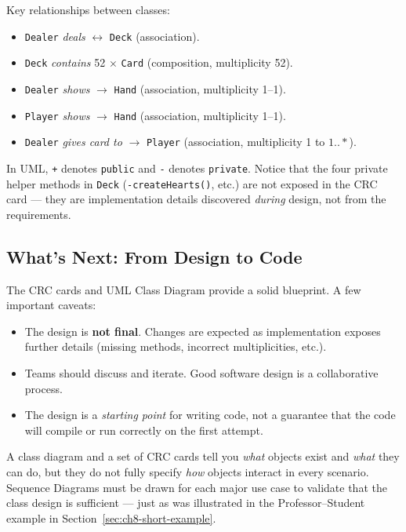 \documentclass[11pt, a4paper, notitlepage]{report}
\theoremstyle{definition}
\theoremstyle{remark}
\theoremstyle{definition}
\begin{document}
\noindent Key relationships between classes:
\begin{itemize}
  \item \texttt{Dealer} \emph{deals} $\longleftrightarrow$ \texttt{Deck} (association).
  \item \texttt{Deck} \emph{contains} 52 $\times$ \texttt{Card} (composition, multiplicity 52).
  \item \texttt{Dealer} \emph{shows} $\longrightarrow$ \texttt{Hand}
        (association, multiplicity 1--1).
  \item \texttt{Player} \emph{shows} $\longrightarrow$ \texttt{Hand}
        (association, multiplicity 1--1).
  \item \texttt{Dealer} \emph{gives card to} $\longrightarrow$ \texttt{Player}
        (association, multiplicity 1 to $1..*$).
\end{itemize}

\begin{examtip}[title={Exam Tip: Visibility and Naming}]
In UML, \texttt{+} denotes \texttt{public} and \texttt{-} denotes \texttt{private}.
Notice that the four private helper methods in \texttt{Deck}
(\texttt{-createHearts()}, etc.) are not exposed in the CRC card --- they are
implementation details discovered \emph{during} design, not from the requirements.
\end{examtip}

\subsection{What's Next: From Design to Code}
\label{subsec:ch8-next}

The CRC cards and UML Class Diagram provide a solid blueprint. A few important caveats:

\begin{itemize}
  \item The design is \textbf{not final}. Changes are expected as implementation exposes
        further details (missing methods, incorrect multiplicities, etc.).
  \item Teams should discuss and iterate. Good software design is a collaborative process.
  \item The design is a \emph{starting point} for writing code, not a guarantee that the
        code will compile or run correctly on the first attempt.
\end{itemize}

\begin{warning}[title={Warning: Design Completeness}]
A class diagram and a set of CRC cards tell you \emph{what} objects exist and
\emph{what} they can do, but they do not fully specify \emph{how} objects interact in
every scenario. Sequence Diagrams must be drawn for each major use case to validate that
the class design is sufficient --- just as was illustrated in the Professor--Student
example in Section~\ref{sec:ch8-short-example}.
\end{warning}
\end{document}
